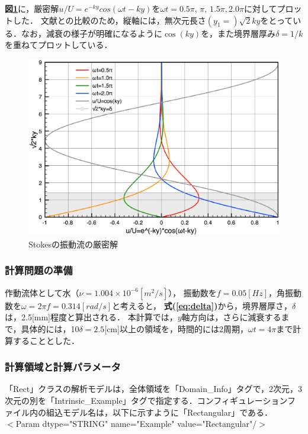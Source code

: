 \textbf{図\ref{fig:stokes_exact}}に，厳密解$u/U=e^{-ky}cos(\omega t-ky)$を$\omega t=0.5\pi, \, \pi, \, 1.5\pi, 2.0\pi$に対してプロットした．
文献\cite{hino:74:fd}との比較のため，縦軸には，無次元長さ$(y_1=)\sqrt{2}ky$をとっている．なお，減衰の様子が明確になるように$\cos(ky)$を，また境界層厚み$\delta = 1/k$を重ねてプロットしている．

\begin{figure}[htbp]
\begin{center}
\includegraphics[width=14cm]{stokes_exact_cos1.eps}
\end{center}
\caption{Stokesの振動流の厳密解}
\label{fig:stokes_exact}
\end{figure}

%
\subsubsection{計算問題の準備}
作動流体として水（$\nu=1.004 \times 10^{-6}[m^2/s]$），
振動数を$f=0.05[Hz]$，角振動数を$\omega=2\pi f=0.314[rad/s]$と考えると，
\textbf{式(\ref{eq:delta})}から，境界層厚さ，$\delta$は，2.5[mm]程度と算出される．
本計算では，$y$軸方向は，さらに減衰するまで，具体的には，10$\delta=2.5$[cm]以上の領域を，時間的には2周期，$\omega t=4\pi$まで計算することとした．

%
\subsubsection{計算領域と計算パラメータ}
「Rect」クラスの解析モデルは，全体領域を「Domain\_Info」タグで，2次元，3次元の別を「Intrinsic\_Example」タグで指定する．コンフィギュレーションファイル内の組込モデル名は，以下に示すように「Rectangular」である．\\
\hspace{1cm} $<$Param dtype="STRING" name="Example" value="Rectangular"/$>$\\

